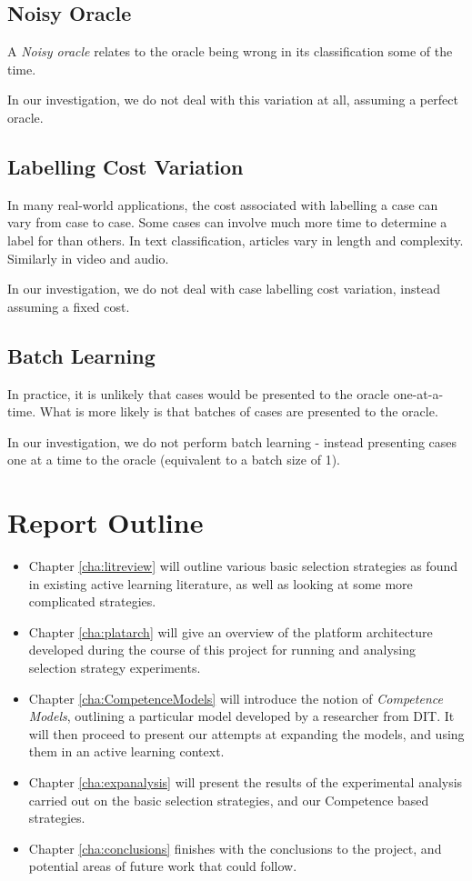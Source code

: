 \documentclass[a4paper,11pt]{report}
\begin{document}
\subsection{Noisy Oracle}
A \emph{Noisy oracle} relates to the oracle being wrong in its classification some of the time.

In our investigation, we do not deal with this variation at all, assuming a perfect oracle.

\subsection{Labelling Cost Variation}
In many real-world applications, the cost associated with labelling a case can vary from case to case. Some cases can involve much more time to determine a label for than others. In text classification, articles vary in length and complexity. Similarly in video and audio.

In our investigation, we do not deal with case labelling cost variation, instead assuming a fixed cost.

\subsection{Batch Learning}
In practice, it is unlikely that cases would be presented to the oracle one-at-a-time. What is more likely is that batches of cases are presented to the oracle.

In our investigation, we do not perform batch learning - instead presenting cases one at a time to the oracle (equivalent to a batch size of 1).

\section{Report Outline}
\begin{itemize}
	\item Chapter \ref{cha:litreview} will outline various basic selection strategies as found in existing active learning literature, as well as looking at some more complicated strategies.
	\item Chapter \ref{cha:platarch} will give an overview of the platform architecture developed during the course of this project for running and analysing selection strategy experiments.
	\item Chapter \ref{cha:CompetenceModels} will introduce the notion of \emph{Competence Models}, outlining a particular model developed by a researcher from DIT. It will then proceed to present our attempts at expanding the models, and using them in an active learning context.
	\item Chapter \ref{cha:expanalysis} will present the results of the experimental analysis carried out on the basic selection strategies, and our Competence based strategies.
	\item Chapter \ref{cha:conclusions} finishes with the conclusions to the project, and potential areas of future work that could follow.
\end{itemize}
\end{document}

